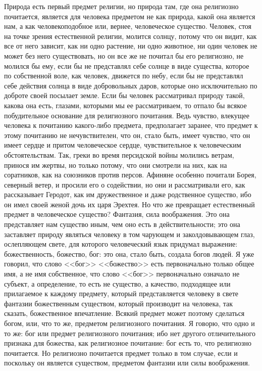 \documentclass[12pt]{article}
\begin{document}
Природа есть первый предмет религии, но природа там, где она религиозно почитается, является для человека предметом не как природа, какой она является нам, а как человекоподобное или, вернее, человеческое существо. Человек, стоя на точке зрения естественной религии, молится солнцу, потому что он видит, как все от него зависит, как ни одно растение, ни одно животное, ни один человек не может без него существовать, но он все же не почитал бы его религиозно, не молился бы ему, если бы не представлял себе солнце в виде существа, которое по собственной воле, как человек, движется по небу, если бы не представлял себе действия солнца в виде добровольных даров, которые оно исключительно по доброте своей посылает земле. Если бы человек рассматривал природу такой, какова она есть, глазами, которыми мы ее рассматриваем, то отпало бы всякое побудительное основание для религиозного почитания. Ведь чувство, влекущее человека к почитанию какого-либо предмета, предполагает заранее, что предмет к этому почитанию не нечувствителен, что он, стало быть, имеет чувство, что он имеет сердце и притом человеческое сердце, чувствительное к человеческим обстоятельствам. Так, греки во время персидской войны молились ветрам, принося им жертвы, но только потому, что они смотрели на них, как на соратников, как на союзников против персов. Афиняне особенно почитали Борея, северный ветер, и просили его о содействии, но они и рассматривали его, как рассказывает Геродот, как им дружественное и даже родственное существо, ибо он имел своей женой дочь их царя Эрехтея. Но что же превращает естественный предмет в человеческое существо? Фантазия, сила воображения. Это она представляет нам существо иным, чем оно есть в действительности; это она заставляет природу являться человеку в том чарующем и заколдовывающем глаз, ослепляющем свете, для которого человеческий язык придумал выражение: божественность, божество, бог: это она, стало быть, создала богов людей. Я уже говорил, что слово <<бог>>  <<божество>> есть первоначально только общее имя, а не имя собственное, что слово <<бог>> первоначально означало не субъект, а определение, то есть не существо, а качество, подходящее или прилагаемое к каждому предмету, который представляется человеку в свете фантазии божественным существом, который производит на человека, так сказать, божественное впечатление. Всякий предмет может поэтому сделаться богом, или, что то же, предметом религиозного почитания. Я говорю, что одно и то же: бог или предмет религиозного почитания; ибо нет другого отличительного признака для божества, как религиозное почитание: бог есть то, что религиозно почитается. Но религиозно почитается предмет только в том случае, если и поскольку он является существом, предметом фантазии или силы воображения. 
\end{document}
